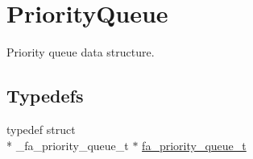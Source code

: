 \hypertarget{group___fa_priority_queue}{\section{Priority\-Queue}
\label{group___fa_priority_queue}
}


Priority queue data structure.  


\subsection*{Typedefs}
\begin{DoxyCompactItemize}
\item 
typedef struct \\*
\-\_\-fa\-\_\-priority\-\_\-queue\-\_\-t $\ast$ \hyperlink{group___fa_priority_queue_ga4363f15ce2b05e7c4af410cd6509ef5a}{fa\-\_\-priority\-\_\-queue\-\_\-t}
\end{DoxyCompactItemize}
